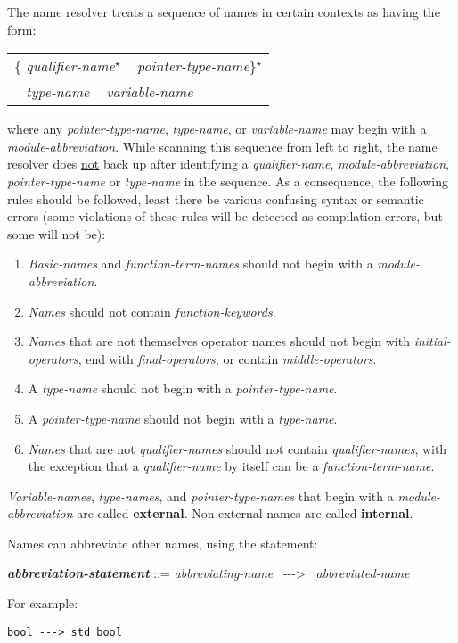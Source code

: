 \documentclass[12pt]{article}
\newcommand{\STAR}{{\Large $^\star$}}
\newcommand{\ABV}{-{}-{}->}
\newcommand{\key}[1]{{\rm \bfseries #1}}
\newcommand{\emkey}[1]{{\em \bfseries #1}}
\newenvironment{indpar}[1][0.3in]%
	{\begin{list}{}%
		     {\setlength{\itemsep}{0in}%
		      \setlength{\topsep}{0in}%
		      \setlength{\parsep}{1ex}%
		      \setlength{\labelwidth}{#1}%
		      \setlength{\leftmargin}{#1}%
		      \addtolength{\leftmargin}{\labelsep}}%
	 \item}%
	{\end{list}}
\begin{document}
The name resolver treats a sequence of
names in certain contexts as having the form:
\begin{center}
\begin{tabular}{l}
\{ {\em qualifier-name}\STAR{} ~ {\em pointer-type-name}\}\STAR{} \\
\hspace*{0.5in}{\em qualifier-name}\STAR{} ~
{\em type-name} ~ {\em variable-name}
\end{tabular}
\end{center}
where any {\em pointer-type-name}, {\em type-name}, or {\em variable-name}
may begin with a {\em module-abbre\-via\-tion}.
While scanning this sequence from left to right,
the name resolver does \underline{not} back up after identifying
a {\em qualifier-name}, {\em module-abbreviation}, {\em pointer-type-name}
or {\em type-name} in the sequence.  As a consequence, the
following rules should be followed, least there be
various confusing syntax or semantic errors (some
violations of these rules will be detected as compilation errors,
but some will not be):
\begin{enumerate}
\item\label{MODULE-ABBREVIATION-RULE}
{\em Basic-names} and {\em function-term-names}
should not begin with a {\em module-abbre\-viation}.
\item\label{FUNCTION-KEYWORD-RULE}
{\em Names} should not contain {\em function-keywords}.
\item\label{OPERATOR-RULE}
{\em Names} that are not themselves operator names should not
begin with {\em initial-operators},
end with {\em final-operators}, or contain {\em middle-operators}.
\item\label{TYPE-NAME-RULE}
A {\em type-name} should not begin with a {\em pointer-type-name}.
\item\label{POINTER-TYPE-NAME-RULE}
A {\em pointer-type-name} should not begin with a {\em type-name}.
\item\label{QUALIFIER-RULE}
{\em Names} that are not {\em qualifier-names}
should not contain {\em qualifier-names}, with the
exception that a {\em qualifier-name} by itself can be
a {\em function-term-name}.
\end{enumerate}

{\em Variable-names}, {\em type-names}, and {\em pointer-type-names}
that begin with a {\em module-abbreviation} are called
\key{external}\label{EXTERNAL-NAME}.
Non-external names are called \key{internal}\label{INTERNAL-NAME}.

Names can abbreviate other names, using the statement:
\begin{indpar}
\emkey{abbreviation-statement}\label{ABBREVIATION-STATEMENT} ::=
    {\em abbreviating-name}~ \ABV{}~ {\em abbreviated-name}
\end{indpar}
For example:
\begin{center}
\tt bool \ABV{} std bool
\end{center}
\end{document}
